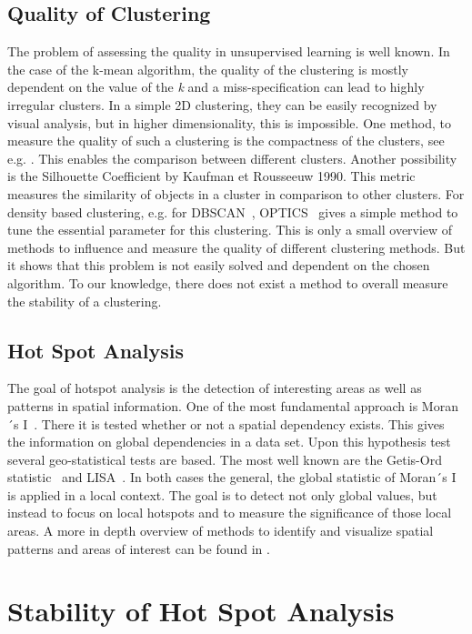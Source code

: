 \documentclass{itatnew}
\begin{document}
\subsection{Quality of Clustering}
The problem of assessing the quality in unsupervised learning is well known. In the case of the k-mean algorithm, the quality of the clustering is mostly dependent on the value of the \emph{k} and a miss-specification can lead to highly irregular clusters. In a simple 2D clustering, they can be easily recognized by visual analysis, but in higher dimensionality, this is impossible. One method, to measure the quality of such a clustering is the compactness of the clusters, see e.g. \cite{CompactnessDataClustering}. This enables the comparison between different clusters. Another possibility is the Silhouette Coefficient by Kaufman et Rousseeuw 1990. This metric measures the similarity of objects in a cluster in comparison to other clusters. For density based clustering, e.g. for DBSCAN~\cite{Ester96adensity-based}, OPTICS~\cite{Ankerst:1999:OOP:304181.304187} gives a simple method to tune the essential parameter for this clustering. This is only a small overview of methods to influence and measure the quality of different clustering methods. But it shows that this problem is not easily solved and dependent on the chosen algorithm. To our knowledge, there does not exist a method to overall measure the stability of a clustering.

\subsection{Hot Spot Analysis}
The goal of hotspot analysis is the detection of interesting areas as well as patterns in spatial information. One of the most fundamental approach is Moran´s I~\cite{MoranI}. There it is tested whether or
not a spatial dependency exists. This gives the information on global
dependencies in a data set. Upon this hypothesis test several geo-statistical
tests are based. The most well known are the Getis-Ord statistic~\cite{Ord.1995}
and LISA~\cite{Anselin.1995}. In both cases the general, the global statistic of
Moran´s I is applied in a local context. The goal is to detect not only global
values, but instead to focus on local hotspots and to measure the significance
of those local areas. A more in depth overview of methods to identify and visualize spatial patterns and areas of interest can be found in \cite{shekhar2011identifying}. 

\section{Stability of Hot Spot Analysis}
\label{sec:Metric}
\end{document}
